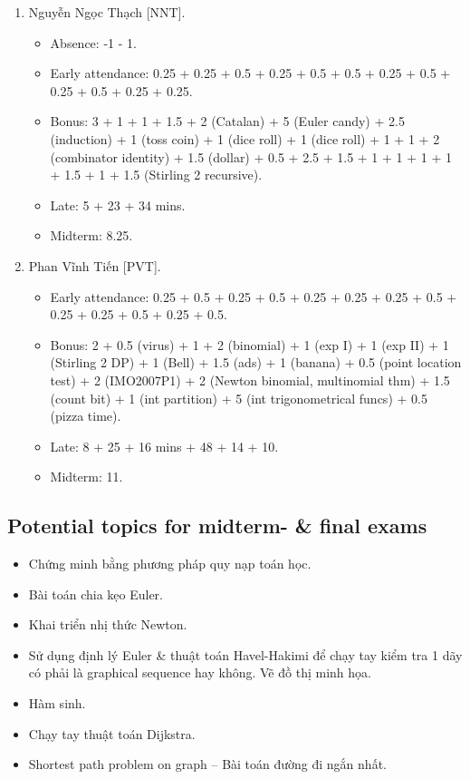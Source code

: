 \documentclass{article}
\begin{document}
\begin{enumerate}
\begin{itemize}
		Chấm report Sơn Tân: 0.25 (a) + 0.25 (b) + 0.25 (c) + 0.25 (e) + 0.25 (g, ghi sai mũ) + 0.25 (h) + 1.5 (Pascal, làm được cho ($\sum_{i=1}^m a_i)^n$ nhiều điểm hơn) + 2 (tính $C_n^k$) + 1 (graphic sequence) + 1.5 (Euler d) + 2.5 (Euler).
        \item Midterm: 6.
	\end{itemize}
	\item {\sc Nguyễn Ngọc Thạch [NNT].}
	\begin{itemize}
        \item Absence: -1 - 1.
		\item Early attendance: 0.25 + 0.25 + 0.5 + 0.25 + 0.5 + 0.5 + 0.25 + 0.5 + 0.25 + 0.5 + 0.25 + 0.25.
		\item Bonus: 3 + 1 + 1 + 1.5 + 2 (Catalan) + 5 (Euler candy) + 2.5 (induction) + 1 (toss coin) + 1 (dice roll) + 1 (dice roll) + 1 + 1 + 2 (combinator identity) + 1.5 (dollar) + 0.5 + 2.5 + 1.5 + 1 + 1 + 1 + 1 + 1.5 + 1 + 1.5 (Stirling 2 recursive).
		\item Late: 5 + 23 + 34 mins.
        \item Midterm: 8.25.
	\end{itemize}
	\item {\sc Phan Vĩnh Tiến [PVT].}
	\begin{itemize}
		\item Early attendance: 0.25 + 0.5 + 0.25 + 0.5 + 0.25 + 0.25 + 0.25 + 0.5 + 0.25 + 0.25 + 0.5 + 0.25 + 0.5.
		\item Bonus: 2 + 0.5 (virus) + 1 + 2 (binomial) + 1 (exp I) + 1 (exp II) + 1 (Stirling 2 DP) + 1 (Bell) + 1.5 (ads) + 1 (banana) + 0.5 (point location test) + 2 (IMO2007P1) + 2 (Newton binomial, multinomial thm) + 1.5 (count bit) + 1 (int partition) + 5 (int trigonometrical funcs) + 0.5 (pizza time).
        \item Late: 8 + 25 + 16 mins + 48 + 14 + 10.
        \item Midterm: 11.
	\end{itemize}
\end{enumerate}


\subsection{Potential topics for midterm- \& final exams}

\begin{itemize}
	\item Chứng minh bằng phương pháp quy nạp toán học.
	\item Bài toán chia kẹo Euler.
	\item Khai triển nhị thức Newton.
	\item Sử dụng định lý Euler \& thuật toán Havel-Hakimi để chạy tay kiểm tra 1 dãy có phải là graphical sequence hay không. Vẽ đồ thị minh họa.
	\item Hàm sinh.
	\item Chạy tay thuật toán Dijkstra.
	\item Shortest path problem on graph -- Bài toán đường đi ngắn nhất.
\end{itemize}
\end{document}

